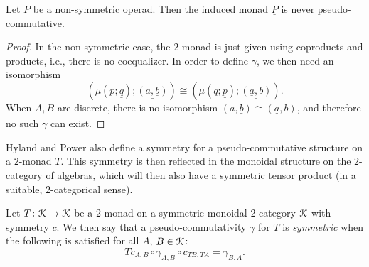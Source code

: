 \begin{cor}\label{cor:not-pc}
Let $P$ be a non-symmetric operad. Then the induced monad $\underline{P}$ is never pseudo-commutative.
\end{cor}
\begin{proof}
In the non-symmetric case, the $2$-monad is just given using coproducts and products, i.e., there is no coequalizer. In order to define $\gamma$, we then need an isomorphism
  \[
    \left(\mu(p; \underline{q}); \underline{(a, \underline{b})}\right) \cong \left(\mu(q; \underline{p}); \underline{(\underline{a},b)}\right).
  \]
When $A,B$ are discrete, there is no isomorphism $\underline{\left(a,\underline{b}\right)} \cong \underline{\left(\underline{a},b\right)}$, and therefore no such $\gamma$ can exist.
\end{proof}



Hyland and Power also define a symmetry for a pseudo-commutative structure on a $2$-monad $T$. This symmetry is then reflected in the monoidal structure on the $2$-category of algebras, which will then also have a symmetric tensor product (in a suitable, $2$-categorical sense).
\begin{Defi}
Let $T \colon \mathcal{K} \rightarrow \mathcal{K}$ be a $2$-monad on a symmetric monoidal $2$-category $\mathcal{K}$ with symmetry $c$. We then say that a pseudo-commutativity $\gamma$ for $T$ is \textit{symmetric} when the following is satisfied for all $A$, $B \in \mathcal{K}$:
    \[
        Tc_{A,B} \circ \gamma_{A,B} \circ c_{TB, TA} = \gamma_{B,A}.
    \]
\end{Defi}

